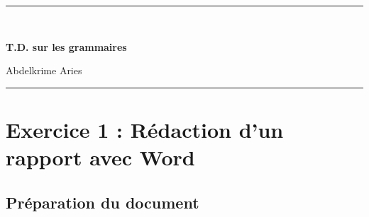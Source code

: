\documentclass[11pt, a4paper]{article}
\begin{document}

\noindent\rule{\textwidth}{1pt}\\[0.25cm]
\noindent
\begin{center}
{\LARGE \textbf{T.D. sur les grammaires}}\\
\begin{flushright}
	Abdelkrime Aries
\end{flushright}
\end{center}
\noindent\rule{\textwidth}{1pt}

\section*{Exercice 1 : Rédaction d'un rapport avec Word}

\subsection*{Préparation du document}
\end{document}
